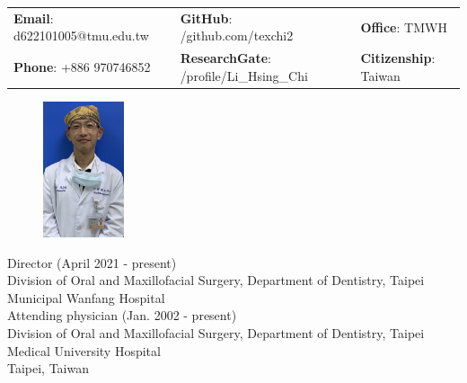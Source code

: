 


%



\vspace{0.5cm} 
\begin{center}
\begin{tabular}{lll}
\textbf{Email}: d622101005@tmu.edu.tw      &
\hspace{0.2cm} \textbf{GitHub}: /github.com/texchi2    &
\hspace{0.2cm} 	\textbf{Office}: TMWH \\

\textbf{Phone}: +886 970746852   & 
\hspace{0.2cm} \textbf{ResearchGate}: 
/profile/Li\_Hsing\_Chi &
\hspace{0.2cm} \textbf{Citizenship}: Taiwan 
\end{tabular}
\end{center}

\begin{figure}
    \centering
    \includegraphics[height=40mm]{IMG_5507_Tex_portrait_TMWH.jpg}
\end{figure}

\noindent
Director (April 2021 - present)\\
Division of Oral and Maxillofacial Surgery, Department of Dentistry, Taipei Municipal Wanfang Hospital\\[4mm]
Attending physician (Jan. 2002 - present)\\
Division of Oral and Maxillofacial Surgery, Department of Dentistry,
Taipei Medical University Hospital\\
Taipei, Taiwan\\

